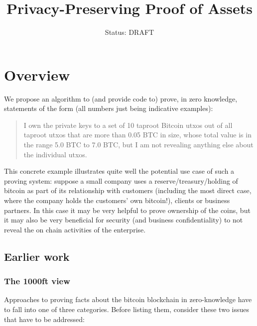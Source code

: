 \documentclass[10pt,a4paper]{article}
\author{Status: DRAFT}
\begin{document}
\title{Privacy-Preserving Proof of Assets}
\maketitle


\section{Overview}

We propose an algorithm to (and provide code to) prove, in zero knowledge, statements of the form (all numbers just being indicative examples):

\begin{quote}
I own the private keys to a set of 10 taproot Bitcoin utxos out of all taproot utxos that are more than 0.05 BTC in size, whose total value is in the range 5.0 BTC to 7.0 BTC, but I am not revealing anything else about the individual utxos.
\end{quote}

This concrete example illustrates quite well the potential use case of such a proving system: suppose a small company uses a reserve/treasury/holding of bitcoin as part of its relationship with customers (including the most direct case, where the company holds the customers' own bitcoin!), clients or business partners. In this case it may be very helpful to prove ownership of the coins, but it may also be very beneficial for security (and business confidentiality) to not reveal the on chain activities of the enterprise.

\vspace{5 pt}

\subsection{Earlier work}

\subsubsection{The 1000ft view}

Approaches to proving facts about the bitcoin blockchain in zero-knowledge have to fall into one of three categories. Before listing them, consider these two issues that have to be addressed:
\end{document}
